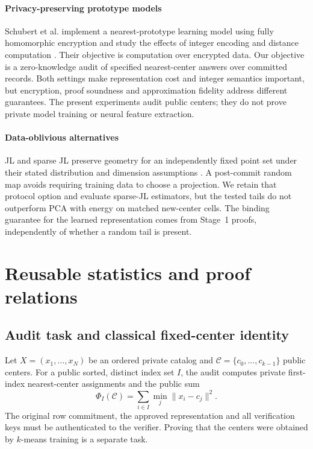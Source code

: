 \documentclass[5p,times,twocolumn]{elsarticle}
\theoremstyle{plain}
\theoremstyle{definition}
\theoremstyle{remark}
\begin{document}
\par\endgroup
\paragraph{\textcolor{RevisionGreen}{Privacy-preserving prototype models}}
\begingroup\color{RevisionGreen}
Schubert et al. implement a nearest-prototype learning model using fully homomorphic encryption and study the effects of integer encoding and distance computation \cite{schubert2026prototype}. Their objective is computation over encrypted data. Our objective is a zero-knowledge audit of specified nearest-center answers over committed records. Both settings make representation cost and integer semantics important, but encryption, proof soundness and approximation fidelity address different guarantees. The present experiments audit public centers; they do not prove private model training or neural feature extraction.


\par\endgroup
\paragraph{\textcolor{RevisionRed}{Data-oblivious alternatives}}
\begingroup\color{RevisionRed}
JL and sparse JL preserve geometry for an independently fixed point set under their stated distribution and dimension assumptions \cite{johnson1984extensions,achlioptas2003database,kane2014sparser,makarychev2019performance}. A post-commit random map avoids requiring training data to choose a projection. We retain that protocol option and evaluate sparse-JL estimators, but the tested tails do not outperform PCA with energy on matched new-center cells. The binding guarantee for the learned representation comes from Stage~1 proofs, independently of whether a random tail is present.


\par\endgroup


\section{\textcolor{RevisionRed}{Reusable statistics and proof relations}}\label{sec:design}
\subsection{\textcolor{RevisionGreen}{Audit task and classical fixed-center identity}}\label{sec:background}
\begingroup\color{RevisionGreen}
Let $X=(x_1,\ldots,x_N)$ be an ordered private catalog and $\mathcal C=\{c_0,\ldots,c_{k-1}\}$ public centers. For a public sorted, distinct index set $I$, the audit computes private first-index nearest-center assignments and the public sum
\begin{equation}
\Phi_I(\mathcal C)=\sum_{i\in I}\min_j\|x_i-c_j\|^2.
\end{equation}
The original row commitment, the approved representation and all verification keys must be authenticated to the verifier. Proving that the centers were obtained by $k$-means training is a separate task.
\end{document}
